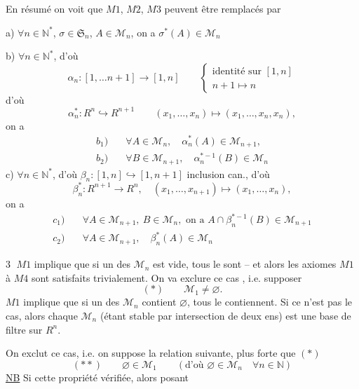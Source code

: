 En résumé on voit que $M1$, $M2$, $M3$ peuvent être remplacés par

a)  $\forall n\in\mathbb N^{*}$, $\sigma\in\mathfrak S_n$, $A\in\mathcal M_n$, on a $\sigma^*(A)\in\mathcal M_n$

b) $\forall n\in\mathbb N^*$, d'où
\[
\alpha_n:[1,\ldots n+1]\longrightarrow[1,n]\qquad
\left\{\begin{gathered}\text{identité sur }[1,n]\\ n+1\longmapsto n\end{gathered}\right.
\]
d'où 
\[
\alpha_n^*:R^n\hookrightarrow R^{n+1}\qquad(x_1,\ldots,x_n)\longmapsto(x_1,\ldots,x_n,x_n),
\]
on a
\[
\begin{aligned}
b_1)\quad&\forall A\in\mathcal M_n,\quad\alpha_n^*(A)\in\mathcal M_{n+1},\\
b_2)\quad&\forall B\in\mathcal M_{n+1},\quad\alpha_n^{*-1}(B)\in\mathcal M_n
\end{aligned}
\]
c) $\forall n\in\mathbb N^*$, d'où $\beta_n:[1,n]\hookrightarrow[1,n+1]$ inclusion can., d'où
\[
\beta_n^*:R^{n+1}\longrightarrow R^n,\quad(x_1,\ldots,x_{n+1})\longmapsto(x_1,\ldots,x_n),
\]
on a
\[
\begin{aligned}
c_1)\quad&\forall A\in\mathcal M_{n+1},\ B\in\mathcal M_n,\text{ on a }A\cap\beta_n^{*-1}(B)\in\mathcal M_{n+1}\\
c_2)\quad&\forall A\in\mathcal M_{n+1},\quad\beta_n^*(A)\in\mathcal M_n
\end{aligned}
\]

\textcircled{3} $M1$ implique que si un des $\mathcal M_n$ est vide, tous le sont -- et alors les axiomes $M1$ à $M4$ sont satisfaits trivialement. On va exclure ce cas , i.e. supposer
\[
(*)\qquad\mathcal M_1\ne\varnothing.
\]
$M1$ implique que si un des $\mathcal M_n$ contient $\varnothing$, tous le contiennent. Si ce n'est pas le cas, alors chaque $\mathcal M_n$ (étant stable par intersection de deux ens) est une base de filtre sur $R^n$.

On exclut ce cas, i.e. on suppose la relation suivante, plus forte que $(*)$
\[
(**)\qquad\varnothing\in\mathcal M_1\qquad(\text{d'où }\varnothing\in\mathcal M_n\quad\forall n\in\mathbb N)
\]
\uline{NB} Si cette propriété  vérifiée, alors posant
